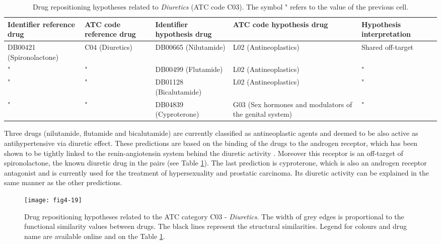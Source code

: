 \begin{table}[htbp]
\scriptsize
\begin{tabular}{|p{2cm}|p{2cm}|p{2cm}|p{3cm}|p{4cm}|}
\hline
\textbf{Identifier reference drug} & \textbf{ATC code reference drug} & \textbf{Identifier hypothesis drug} & \textbf{ATC code hypothesis drug} & \textbf{Hypothesis interpretation} \\ \hline
DB00421 (Spironolactone) & C04 (Diuretics) & DB00665 (Nilutamide) & L02 (Antineoplastics) & Shared off-target \\ \hline
" & " & DB00499 (Flutamide) & L02 (Antineoplastics) & " \\ \hline
" & " & DB01128 (Bicalutamide) & L02 (Antineoplastics) & " \\ \hline
" & " & DB04839 (Cyproterone) & G03 (Sex hormones and modulators of the genital system) & " \\ \hline
\end{tabular}
\caption{Drug repositioning hypotheses related to \emph{Diuretics} (ATC code C03). The symbol " refers to the value of the previous cell.}
\label{table:tablec03}
\end{table}

Three drugs (nilutamide, flutamide and bicalutamide) are currently classified as antineoplastic agents and deemed to be also active as antihypertensive via diuretic effect. These predictions are based on the binding of the drugs to the androgen receptor, which has been shown to be tightly linked to the renin-angiotensin system behind the diuretic activity \citep{ikeda2009androgen} \citep{hoshino2011regulation}. Moreover this receptor is an off-target of spironolactone, the known diuretic drug in the pairs (see Table \ref{table:tablec03}). The last prediction is cyproterone, which is also an androgen receptor antagonist and is currently used for the treatment of hypersexuality and prostatic carcinoma. Its diuretic activity can be explained in the same manner as the other predictions.

\begin{figure}[H]
    \centering
    \texttt{[image: fig4-19]}
    \caption{Drug repositioning hypotheses related to the ATC category C03 - \emph{Diuretics}. The width of grey edges is proportional to the functional similarity values between drugs. The black lines represent the structural similarities. Legend for colours and drug name are available online and on the Table \ref{table:tablec03}.}
    \label{fig4-19}
\end{figure}

